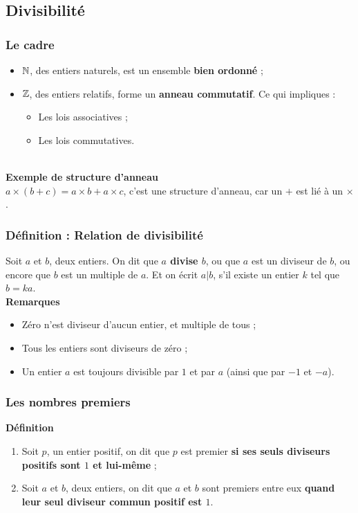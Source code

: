 \subsection{Divisibilité}

\subsubsection{Le cadre}
    \begin{itemize}
        \item $\mathbb N$, des entiers naturels, est un ensemble
            \textbf{bien ordonné} ;
        \item $\mathbb Z$, des entiers relatifs, forme un
            \textbf{anneau commutatif}. Ce qui impliques :
            \begin{itemize}
                \item Les lois associatives ;
                \item Les lois commutatives.
            \end{itemize}
    \end{itemize}
    
    ~\\ \noindent\textbf{Exemple de structure d'anneau}\\
    \indent $ a \times (b + c) = a \times b + a \times c $,
    c'est une structure d'anneau, car un $+$ est lié à un $\times$.
    
\subsubsection{Définition : Relation de divisibilité}
    Soit $a$ et $b$, deux entiers. On dit que \textbf{$a$ divise $b$},
    ou que $a$ est un diviseur de $b$, ou encore que $b$ est un multiple
    de $a$. Et on écrit $a | b$, s'il existe un entier $k$ tel que $b = ka$.\\
    
    \noindent\textbf{Remarques}
    \begin{itemize}
        \item Zéro n'est diviseur d'aucun entier, et multiple de tous ;
        \item Tous les entiers sont diviseurs de zéro ;
        \item Un entier $a$ est toujours divisible par $1$ et par $a$
        (ainsi que par $-1$ et $-a$).
    \end{itemize}
    
\subsubsection{Les nombres premiers}
    \noindent\textbf{Définition}
    \begin{enumerate}
        \item Soit $p$, un entier positif, on dit que $p$ est premier 
            \textbf{si ses seuls diviseurs positifs sont $1$ et lui-même} ;
        \item Soit $a$ et $b$, deux entiers, on dit que $a$ et $b$
            sont premiers entre eux \textbf{quand leur seul diviseur commun positif est $1$}.
    \end{enumerate}
    

